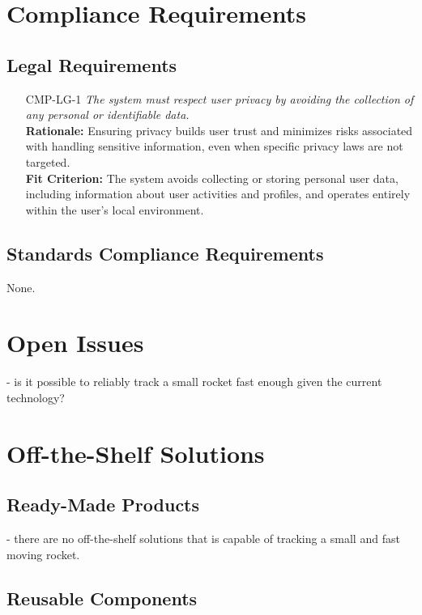 \documentclass[12pt]{article}
\begin{document}
\section{Compliance Requirements}
\subsection{Legal Requirements}
\begin{itemize}[leftmargin=*]
  \item[CMP-LG-1] \emph{The system must respect user privacy by avoiding the collection
          of any personal or identifiable data.}\\ \textbf{Rationale:} Ensuring privacy
        builds user trust and minimizes risks associated with handling sensitive
        information, even when specific privacy laws are not targeted.\\ \textbf{Fit
          Criterion:} The system avoids collecting or storing personal user data,
        including information about user activities and profiles, and operates entirely
        within the user's local environment.
\end{itemize}

\subsection{Standards Compliance Requirements}

None.

\section{Open Issues}

- is it possible to reliably track a small rocket fast enough given the current technology?

\section{Off-the-Shelf Solutions}
\subsection{Ready-Made Products}

- there are no off-the-shelf solutions that is capable of tracking a small and fast moving rocket.

\subsection{Reusable Components}
\end{document}

